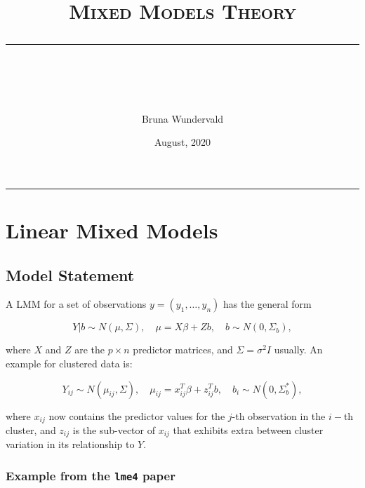 \documentclass[]{article}
\author{}
\date{\vspace{-2.5em}}
\begin{document}
\title{  
 \normalfont \normalsize 
 \textsc{Mixed Models Theory}\\[25pt]
\author{Bruna Wundervald}
\date{\normalsize August, 2020}
\rule{\linewidth}{2pt} \\[ .5cm]}

\maketitle

\vspace{\fill}

\tableofcontents

\rule{\linewidth}{1pt}

\newpage

\hypertarget{linear-mixed-models}{%
\section{Linear Mixed Models}\label{linear-mixed-models}}

\hypertarget{model-statement}{%
\subsection{Model Statement}\label{model-statement}}

A LMM for a set of observations \(y = (y_1, \dots, y_n)\) has the
general form

\begin{equation}
Y | b \sim N(\mu, \Sigma), \quad \mu = X\beta + Zb, \quad b \sim N(0, \Sigma_{b}),
\end{equation}

where \(X\) and \(Z\) are the \(p \times n\) predictor matrices, and
\(\Sigma = \sigma^2 I\) usually. An example for clustered data is:

\begin{equation}
Y_{ij} \sim N(\mu_{ij}, \Sigma), \quad \mu_{ij} = x^{T}_{ij} \beta + z^{T}_{ij} b, \quad b_i \sim N(0, \Sigma^{*}_{b}),
\end{equation}

where \(x_{ij}\) now contains the predictor values for the \(j\)-th
observation in the \(i-\)th cluster, and \(z_{ij}\) is the sub-vector of
\(x_{ij}\) that exhibits extra between cluster variation in its
relationship to \(Y\).

\hypertarget{example-from-the-lme4-paper}{%
\subsubsection{\texorpdfstring{Example from the \texttt{lme4}
paper}{Example from the lme4 paper}}\label{example-from-the-lme4-paper}}
\end{document}
